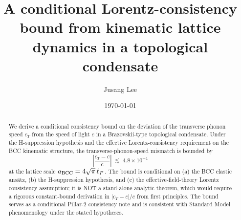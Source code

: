 



\title{A conditional Lorentz-consistency bound from kinematic lattice
dynamics in a topological condensate}

\author{Jusang Lee}

\date{\today}

\begin{abstract}
We derive a conditional consistency bound on the deviation of the
transverse phonon speed $c_T$ from the speed of light $c$ in a
Brazovskii-type topological condensate. Under the H-suppression
hypothesis and the effective Lorentz-consistency requirement on the
BCC kinematic structure, the transverse-phonon-speed mismatch is
bounded by
\[
\left|\frac{c_T - c}{c}\right| \;\lesssim\; 4.8 \times 10^{-4}
\]
at the lattice scale $a_{\rm BCC} = 4\sqrt{\pi}\,\ell_P$. The bound
is conditional on (a) the BCC elastic ans\"atz, (b) the
H-suppression hypothesis, and (c) the effective-field-theory Lorentz
consistency assumption; it is NOT a stand-alone analytic theorem,
which would require a rigorous constant-bound derivation in
$|c_T - c|/c$ from first principles. The bound serves as a
conditional Pillar-2 consistency note and is consistent with Standard
Model phenomenology under the stated hypotheses.
\end{abstract}

